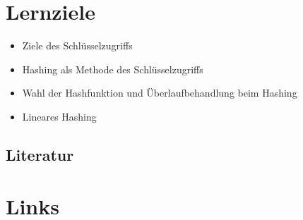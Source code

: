 \section*{Lernziele}
\begin{itemize}
	\item Ziele des Schlüsselzugriffs
	\item Hashing als Methode des Schlüsselzugriffs
	\item Wahl der Hashfunktion und Überlaufbehandlung beim Hashing
	\item Lineares Hashing
\end{itemize}


\begin{normalText}
\section*{Literatur}

\end{normalText}

\section*{Links}
\begin{description}
\ViseAuD
\end{description}
